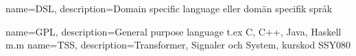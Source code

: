 {
    name=DSL,
    description={Domain specific language eller domän specifik språk}
}

{
    name=GPL,
    description={General purpose language t.ex C, C++, Java, Haskell m.m}
}
{
    name=TSS,
    description={Transformer, Signaler och System, kurskod SSY080}
}
